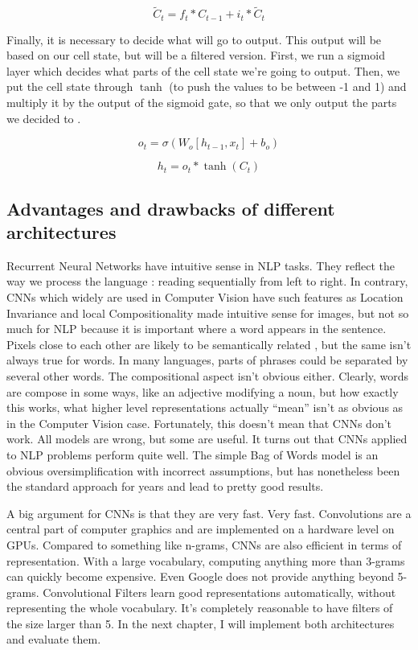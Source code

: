 \begin{equation}
\tilde{C}_t = f_t*{C}_{t-1} + i_t*\tilde{C}_t
\end{equation}

Finally, it is necessary to decide what will go to output. This output will be based on our cell state, but will be a filtered version. First, we run a sigmoid layer which decides what parts of the cell state we’re going to output. Then, we put the cell state through $\tanh$ (to push the values to be between -1 and 1) and multiply it by the output of the sigmoid gate, so that we only output the parts we decided to \cite{colah_lstm} .

\begin{equation}
o_t = \sigma(W_o[h_{t-1}, x_t] + b_o)
\end{equation}

\begin{equation}
h_t = o_t * \tanh(C_t)
\end{equation}

\subsection{Advantages and drawbacks of different architectures} 

Recurrent Neural Networks have intuitive sense in NLP tasks. They reflect the way we process the language : reading sequentially from left to right. 
In contrary, CNNs which widely are used in Computer Vision have such features as Location Invariance and local Compositionality made intuitive sense for images, but not so much for NLP because it is important where a word appears in the sentence. Pixels close to each other are likely to be semantically related , but the same isn’t always true for words.  In many languages, parts of phrases could be separated by several other words. The compositional aspect isn’t obvious either. Clearly, words are compose in some ways, like an adjective modifying a noun, but how exactly this works, what higher level representations actually “mean” isn’t as obvious as in the Computer Vision case. Fortunately, this doesn’t mean that CNNs don’t work.  All models are wrong, but some are useful. It turns out that CNNs applied to NLP problems perform quite well. The simple Bag of Words model is an obvious oversimplification with incorrect assumptions, but has nonetheless been the standard approach for years and lead to pretty good results.

A big argument for CNNs is that they are very fast. Very fast. Convolutions are a central part of computer graphics and are implemented on a hardware level on GPUs. Compared to something like n-grams, CNNs are also efficient in terms of representation. With a large vocabulary, computing anything more than 3-grams can quickly become expensive. Even Google does not provide anything beyond 5-grams. Convolutional Filters learn good representations automatically, without representing the whole vocabulary. It’s completely reasonable to have filters of the size larger than 5.\cite{wildml}
In the next chapter, I will implement both architectures and evaluate them.

